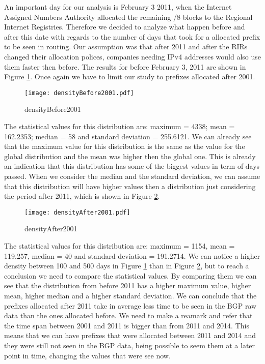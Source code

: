 \documentclass[11pt,a4paper]{scrreprt}
\begin{document}
An important day for our analysis is February 3 2011, when the Internet Assigned Numbers Authority allocated the remaining /8 blocks to the Regional Internet Registries. Therefore we decided to analyze what happen before and after this date with regards to the number of days that took for a allocated prefix to be seen in routing. Our assumption was that after 2011 and after the RIRs changed their allocation polices, companies needing IPv4 addresses would also use them faster then before. 
The results for before February 3, 2011 are shown in Figure \ref{fig:densityBefore2001}. Once again we have to limit our study to prefixes allocated after 2001.  


\begin{figure}[ht!]
\centering
\texttt{[image: densityBefore2001.pdf]}
\caption{densityBefore2001}
\label{fig:densityBefore2001}
\end{figure}

The statistical values for this distribution are: maximum = 4338; mean = 162.2353; median = 58 and standard deviation = 255.6121. We can already see that the maximum value for this distribution is the same as the value for the global distribution and the mean was higher then the global one. This is already an indication that this distribution has some of the biggest values in term of days passed. When we consider the median and the standard deviation, we can assume that this distribution will have higher values then a distribution just considering the period after 2011, which is shown in Figure \ref{fig:densityAfter2001}.


\begin{figure}[ht!]
\centering
\texttt{[image: densityAfter2001.pdf]}
\caption{densityAfter2001}
\label{fig:densityAfter2001}
\end{figure}

The statistical values for this distribution are: maximum = 1154, mean = 119.257, median = 40 and standard deviation = 191.2714. We can notice a higher density between 100 and 500 days in Figure \ref{fig:densityBefore2001} than in Figure \ref{fig:densityAfter2001}, but to reach a conclusion we need to compare the statistical values. By comparing them we can see that the distribution from before 2011 has a higher maximum value, higher mean, higher median and a higher standard deviation. We can conclude that the prefixes allocated after 2011 take in average less time to be seen in the BGP raw data than the ones allocated before. We need to make a reamark and refer that the time span between 2001 and 2011 is bigger than from 2011 and 2014. This means that we can have prefixes that were allocated between 2011 and 2014 and they were still not seen in the BGP data, being possible to seem them at a later point in time, changing the values that were see now.
\end{document}
